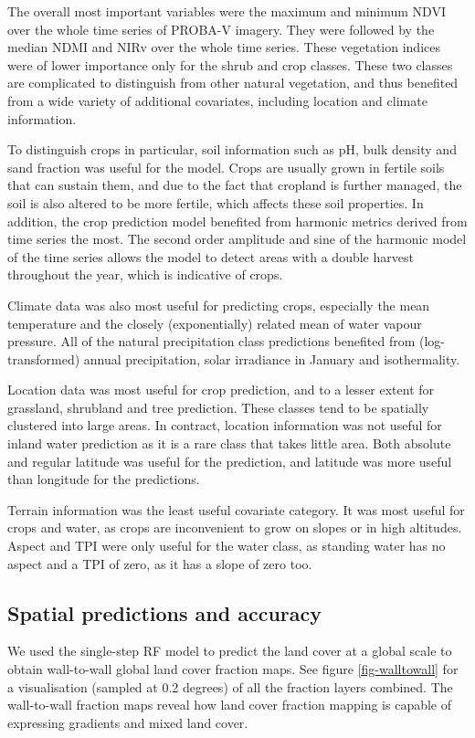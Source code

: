 \documentclass[review,authoryear,3p]{elsarticle}
\begin{document}
The overall most important variables were the maximum and minimum NDVI over the whole time series of PROBA-V imagery.
They were followed by the median NDMI and NIRv over the whole time series.
These vegetation indices were of lower importance only for the shrub and crop classes.
These two classes are complicated to distinguish from other natural vegetation, and thus benefited from a wide variety of additional covariates, including location and climate information.

To distinguish crops in particular, soil information such as pH, bulk density and sand fraction was useful for the model.
Crops are usually grown in fertile soils that can sustain them, and due to the fact that cropland is further managed, the soil is also altered to be more fertile, which affects these soil properties.
In addition, the crop prediction model benefited from harmonic metrics derived from time series the most.
The second order amplitude and sine of the harmonic model of the time series allows the model to detect areas with a double harvest throughout the year, which is indicative of crops.

Climate data was also most useful for predicting crops, especially the mean temperature and the closely (exponentially) related mean of water vapour pressure.
All of the natural precipitation class predictions benefited from (log-transformed) annual precipitation, solar irradiance in January and isothermality.

Location data was most useful for crop prediction, and to a lesser extent for grassland, shrubland and tree prediction.
These classes tend to be spatially clustered into large areas.
In contract, location information was not useful for inland water prediction as it is a rare class that takes little area.
Both absolute and regular latitude was useful for the prediction, and latitude was more useful than longitude for the predictions.

Terrain information was the least useful covariate category.
It was most useful for crops and water, as crops are inconvenient to grow on slopes or in high altitudes.
Aspect and \gls{TPI} were only useful for the water class, as standing water has no aspect and a \gls{TPI} of zero, as it has a slope of zero too.

\subsection{Spatial predictions and accuracy}

We used the single-step \gls{RF} model to predict the land cover at a global scale to obtain wall-to-wall global land cover fraction maps.
See figure \ref{fig-walltowall} for a visualisation (sampled at 0.2 degrees) of all the fraction layers combined.
The wall-to-wall fraction maps reveal how land cover fraction mapping is capable of expressing gradients and mixed land cover.
\end{document}
